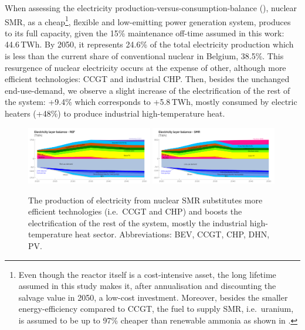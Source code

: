 \documentclass[11pt,twoside,a4paper,english]{article}
\def\ie{i.e.\ }
\begin{document}
When assessing the electricity production-versus-consumption-balance (), nuclear SMR, as a cheap\footnote{Even though the reactor itself is a cost-intensive asset, the long lifetime assumed in this study makes it, after annualisation and discounting the salvage value in 2050, a low-cost investment. Moreover, besides the smaller energy-efficiency compared to \gls{CCGT}, the fuel to supply SMR, \ie uranium, is assumed to be up to 97\% cheaper than renewable ammonia as shown in .}, flexible and low-emitting power generation system, produces to its full capacity, given the 15\% maintenance off-time assumed in this work: 44.6\,TWh. By 2050, it represents 24.6\% of the total electricity production which is less than the current share of conventional nuclear in Belgium, 38.5\%. This resurgence of nuclear electricity occurs at the expense of other, although more efficient technologies: \gls{CCGT} and industrial \gls{CHP}. Then, besides the unchanged end-use-demand, we observe a slight increase of the electrification of the rest of the system: +9.4\% which corresponds to +5.8\,TWh, mostly consumed by electric heaters (+48\%) to produce industrial high-temperature heat.

\begin{figure}[!htbp]
\centering
\includegraphics[width=0.49\textwidth]{figures/Elec_Layer_REF.pdf}
\includegraphics[width=0.49\textwidth]{figures/Elec_Layer_SMR.pdf}
\caption{The production of electricity from nuclear SMR substitutes more efficient technologies (\ie \gls{CCGT} and \gls{CHP}) and boosts the electrification of the rest of the system, mostly the industrial high-temperature heat sector. Abbreviations: \acrfull{BEV}, \acrfull{CCGT}, \acrfull{CHP}, \acrfull{DHN}, \acrfull{PV}.}
\label{fig:results_deter_layer_elec}
\end{figure}
\end{document}
